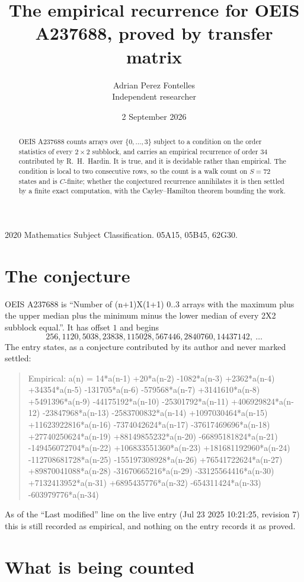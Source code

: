 \documentclass[11pt,a4paper]{article}
\title{The empirical recurrence for OEIS A237688, proved by transfer matrix}
\author{Adrian Perez Fontelles\\ \small Independent researcher}
\date{2 September 2026}
\theoremstyle{plain}
\theoremstyle{definition}
\begin{document}
\maketitle

\begin{abstract}
OEIS A237688 counts arrays over $\{0,\dots,3\}$ subject to a condition on the order
statistics of every $2\times2$ subblock, and carries an empirical recurrence of order
$34$ contributed by R.~H.~Hardin. It is true, and it is decidable rather than empirical.
The condition is local to two consecutive rows, so the count is a walk count on $S=72$
states and is $C$-finite; whether the conjectured recurrence annihilates it is then settled by
a finite exact computation, with the Cayley--Hamilton theorem bounding the work.
\end{abstract}

\noindent\small 2020 Mathematics Subject Classification. 05A15, 05B45, 62G30.\normalsize

\section{The conjecture}

OEIS A237688 is ``Number of (n+1)X(1+1) 0..3 arrays with the maximum plus the upper median plus the minimum minus the lower median of every 2X2 subblock equal.''. It has offset $1$ and begins
\[
256, 1120, 5038, 23838, 115028, 567446, 2840760, 14437142,\ \dots
\]
The entry states, as a conjecture contributed by its author and never marked settled:
\begin{quote}
Empirical: a(n) = 14*a(n-1) +20*a(n-2) -1082*a(n-3) +2362*a(n-4) +34354*a(n-5) -131705*a(n-6) -579568*a(n-7) +3141610*a(n-8) +5491396*a(n-9) -44175192*a(n-10) -25301792*a(n-11) +406929824*a(n-12) -23847968*a(n-13) -2583700832*a(n-14) +1097030464*a(n-15) +11623922816*a(n-16) -7374042624*a(n-17) -37617469696*a(n-18) +27740250624*a(n-19) +88149855232*a(n-20) -66895181824*a(n-21) -149456072704*a(n-22) +106833551360*a(n-23) +181681192960*a(n-24) -112708681728*a(n-25) -155197308928*a(n-26) +76541722624*a(n-27) +89870041088*a(n-28) -31670665216*a(n-29) -33125564416*a(n-30) +7132413952*a(n-31) +6895435776*a(n-32) -654311424*a(n-33) -603979776*a(n-34)
\end{quote}
As of the ``Last modified'' line on the live entry (Jul 23 2025 10:21:25, revision 7) this is still
recorded as empirical, and nothing on the entry records it as proved.

\section{What is being counted}
\end{document}

